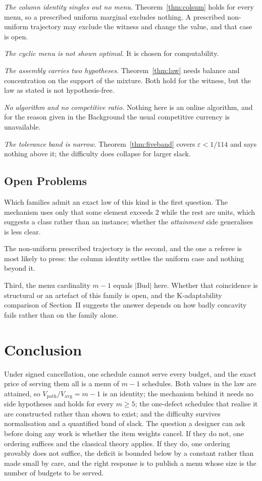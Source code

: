 \emph{The column identity singles out no menu.} Theorem~\ref{thm:colsum} holds for every
menu, so a prescribed uniform marginal excludes nothing. A prescribed non-uniform trajectory
may exclude the witness and change the value, and that case is open.

\emph{The cyclic menu is not shown optimal.} It is chosen for computability.

\emph{The assembly carries two hypotheses.} Theorem~\ref{thm:law} needs balance and
concentration on the support of the mixture. Both hold for the witness, but the law as stated
is not hypothesis-free.

\emph{No algorithm and no competitive ratio.} Nothing here is an online algorithm, and for
the reason given in the Background the usual competitive currency is unavailable.

\emph{The tolerance band is narrow.} Theorem~\ref{thm:fiveband} covers
$\varepsilon<1/114$ and says nothing above it; the difficulty does collapse for larger
slack.

\subsection{Open Problems}

Which families admit an exact law of this kind is the first question. The mechanism uses only
that some element exceeds $2$ while the rest are units, which suggests a class rather than an
instance; whether the \emph{attainment} side generalises is less clear.

The non-uniform prescribed trajectory is the second, and the one a referee is most likely to
press: the column identity settles the uniform case and nothing beyond it.

Third, the menu cardinality $m-1$ equals $|\mathrm{Bud}|$ here. Whether that coincidence is
structural or an artefact of this family is open, and the K-adaptability comparison of
Section~II suggests the answer depends on how badly concavity fails rather than on the family
alone.

\section{Conclusion}

Under signed cancellation, one schedule cannot serve every budget, and the exact price of
serving them all is a menu of $m-1$ schedules. Both values in the law are attained, so
$V_{\mathrm{path}}/V_{\mathrm{avg}}=m-1$ is an identity; the mechanism behind it needs no
side hypotheses and holds for every $m\ge5$; the one-defect schedules that realise it are
constructed rather than shown to exist; and the difficulty survives normalisation and a
quantified band of slack. The question a designer can ask before doing any work is whether
the item weights cancel. If they do not, one ordering suffices and the classical theory
applies. If they do, one ordering provably does not suffice, the deficit is bounded below by
a constant rather than made small by care, and the right response is to publish a menu whose
size is the number of budgets to be served.

